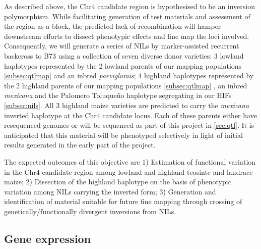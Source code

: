 As described above, the Chr4 candidate region is hypothesised to be an inversion polymorphism. While facilitating generation of test materials and assessment of the region as a block, the predicted lack of recombination will hamper downstream efforts to dissect phenotypic effects and fine map the loci involved. Consequently, we will generate a series of NILs by marker-assisted recurrent backcross to B73 using a collection of seven diverse donor varieties: 3 lowland haplotypes represented by the 2 lowland parents of our mapping populations \ref{subsec:qtlmap} and an inbred \emph{parviglumis}; 4 highland haplotypes represented by the 2 highland parents of our mapping populations \ref{subsec:qtlmap} , an inbred \emph{mexicana} and the Palomero Toluque\~no haplotype segregating in our HIFs \ref{subsec:nils}. All 3 highland maize varieties are predicted to carry the \emph{mexicana} inverted haplotype at the Chr4 candidate locus.  Each of these parents either have resequenced genomes \citep{Vielle-Calzada2009, Chia2012a} or will be sequenced as part of this project in \ref{sec:qtl}. It is anticipated that this material will be phenotyped selectively in light of initial results generated in the early part of the project.

The expected outcomes of this objective are 1) Estimation of functional variation in the Chr4 candidate region among lowland and highland teosinte and landrace maize; 2) Dissection of the highland haplotype on the basis of phenotypic variation among NILs carrying the inverted form; 3) Generation and identification of material suitable for future fine mapping through crossing of genetically/functionally divergent inversions from NILs.   

\subsection{Gene expression} \label{subsec:rnaseq}

